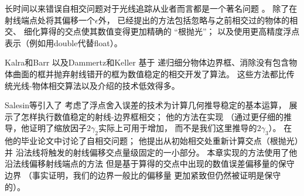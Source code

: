 长时间以来错误自相交问题对于光线追踪从业者而言都是一个著名问题
\citep{10.5555/94788.94790,Amanatides1990:27}。
除了在射线端点处将其偏移一个$\epsilon$外，
已经提出的方法包括忽略与之前相交过的物体的相交、
细化算得的交点使其数值变得更加精确的
“根抛光”\citep{10.5555/94788.94790,536271}；
以及使用更高精度浮点表示（例如用{\ttfamily double}代替{\ttfamily float}）。

Kalra和Barr \parencite*{10.1145/74334.74364}以及Dammertz和Keller \parencite*{4061542}基于
递归细分物体边界框、消除没有包含物体曲面的框并抛弃射线错开的框为数值稳定的相交开发了算法。
这些方法都比传统光线-物体相交算法以及介绍的技术低效得多。

Salesin等\parencite*{10.1145/73833.73857}引入了
考虑了浮点舍入误差的技术为计算几何推导稳定的基本运算，
\citet{Ize2013BVH}展示了怎样执行数值稳定的射线-边界框相交；
他的方法在实现
（通过更仔细的推导，他证明了缩放因子$2\gamma_2$实际上可用于增加，
而不是我们这里推导的$2\gamma_3$）。
\citet{Wächter_2008}在他的毕业论文中讨论了自相交问题；
他提出从初始相交处重新计算交点（根抛光）并
沿法线将触发的射线偏移交点量级固定的一小部分。
本章实现的方法使用了他沿法线偏移射线端点的方法
但是基于算得的交点中出现的数值误差偏移量的保守边界
（事实证明，我们的边界一般比\citeauthor{Wächter_2008}的偏移量
更加紧致但仍然被证明是保守的）。
